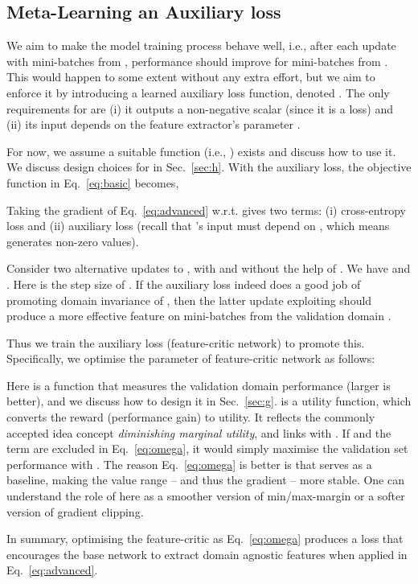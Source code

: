 \documentclass{article}
\begin{document}
\subsection{Meta-Learning an Auxiliary loss}

We aim to make the model training process behave well, i.e., after each  update with mini-batches from , performance should improve for  mini-batches from . This would happen to some extent without any extra effort, but we aim to enforce it by introducing a learned auxiliary loss function, denoted . The only requirements for  are (i) it outputs a non-negative scalar (since it is a loss) and (ii) its input depends on the  feature extractor's parameter .

For now, we assume a suitable function  (i.e., ) exists and discuss how to use it. We discuss design choices for  in Sec.~\ref{sec:h}. With the auxiliary loss, the objective function in Eq.~\ref{eq:basic} becomes,


Taking the gradient of Eq.~\ref{eq:advanced} w.r.t.  gives two terms: (i) cross-entropy loss and (ii) auxiliary loss (recall that 's input must depend on , which means   generates non-zero values). 

Consider two alternative updates to , with and without the help of . We have  and . Here  is the step size of . If the auxiliary loss  indeed does a good job of promoting domain invariance of , then the latter update  exploiting  should produce a more effective feature on mini-batches from the validation domain .

Thus we train the auxiliary loss (feature-critic network) to promote this. Specifically, we optimise the parameter  of feature-critic network as follows: 

\noindent Here  is a function that measures the validation domain performance (larger is better), and we discuss how to design it in Sec.~\ref{sec:g}.  is a utility function, which converts the reward (performance gain) to utility. It reflects the commonly accepted idea concept \emph{diminishing marginal utility}, and links    with . If  and the  term are excluded in  Eq.~\ref{eq:omega}, it would simply maximise the  validation set performance with . The reason Eq.~\ref{eq:omega} is better is that   serves as a baseline, making the value range -- and thus the gradient -- more stable. One can understand the role of   here as a smoother version of min/max-margin or a softer version of gradient clipping.

In summary, optimising the feature-critic  as Eq.~\ref{eq:omega} produces a loss  that encourages  the base network to extract domain agnostic features when applied in Eq.~\ref{eq:advanced}.
\end{document}
